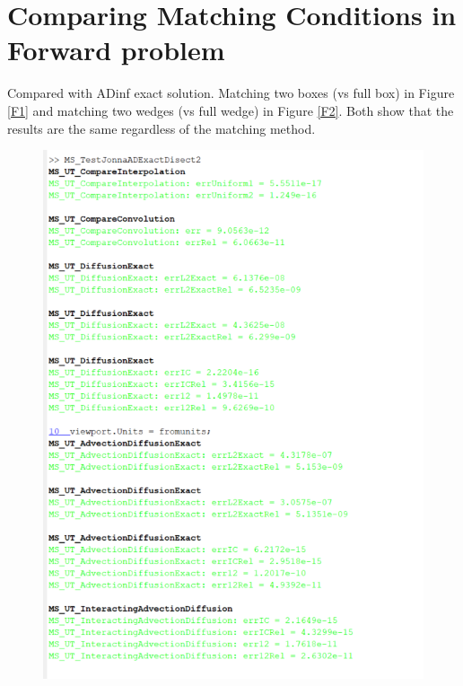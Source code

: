 \documentclass[11pt, a4paper]{article}
\theoremstyle{definition}
\begin{document}
	\section*{Comparing Matching Conditions in Forward problem}
	Compared with ADinf exact solution. Matching two boxes (vs full box) in Figure \ref{F1} and matching two wedges (vs full wedge) in Figure \ref{F2}. Both show that the results are the same regardless of the matching method.
	\begin{figure}[h]
		\centering
		\includegraphics[scale=0.7]{rhoDymatch.png}

\end{figure}
\end{document}
